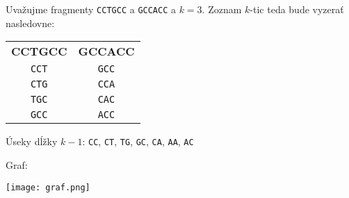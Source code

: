     \begin{example}
        Uvažujme fragmenty \texttt{CCTGCC} a \texttt{GCCACC} a $k = 3$. Zoznam
        $k$-tic teda bude vyzerať nasledovne:
        
        \bigskip
        
        \begin{tabular}{ c c }
            \textbf{CCTGCC} & \textbf{GCCACC} \\  
            \texttt{CCT}    & \texttt{GCC}    \\
            \texttt{CTG}    & \texttt{CCA}    \\
            \texttt{TGC}    & \texttt{CAC}    \\
            \texttt{GCC}    & \texttt{ACC}    \\
        \end{tabular}  
        
        \bigskip
        
        Úseky dĺžky $k-1$: \texttt{CC}, \texttt{CT}, \texttt{TG}, \texttt{GC},
        \texttt{CA}, \texttt{AA}, \texttt{AC}
        
        \bigskip
        
        Graf: 
        
        \texttt{[image: graf.png]}
    \end{example}